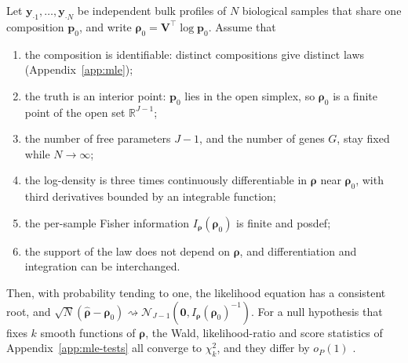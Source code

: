 \begin{proposition}
  \label{pr:mle-regularity}
  Let \(\boldsymbol{y}_{\cdot1},\ldots,\boldsymbol{y}_{\cdot N}\) be independent bulk profiles of \(N\) biological samples that share
  one composition \(\boldsymbol{p}_{0}\), and write \(\boldsymbol{\rho}_{0}=\mathbf{V}^{\top}\log\boldsymbol{p}_{0}\).
  Assume that
  \begin{enumerate}
    \item[(R1)] the composition is identifiable: distinct compositions give distinct laws (Appendix~\ref{app:mle});
    \item[(R2)] the truth is an interior point: \(\boldsymbol{p}_{0}\) lies in the open simplex, so \(\boldsymbol{\rho}_{0}\) is a finite
          point of the open set \(\mathbb{R}^{J-1}\);
    \item[(R3)] the number of free parameters \(J-1\), and the number of genes \(G\), stay fixed while
          \(N\to\infty\);
    \item[(R4)] the log-density is three times continuously differentiable in \(\boldsymbol{\rho}\) near \(\boldsymbol{\rho}_{0}\), with third
          derivatives bounded by an integrable function;
    \item[(R5)] the per-sample Fisher information \(I_{\boldsymbol{\rho}}(\boldsymbol{\rho}_{0})\) is finite and \gls{posdef};
    \item[(R6)] the support of the law does not depend on \(\boldsymbol{\rho}\), and differentiation and integration
          can be interchanged.
  \end{enumerate}
  Then, with probability tending to one, the likelihood equation has a consistent root, and
  \(\sqrt{N}(\hat{\boldsymbol{\rho}}-\boldsymbol{\rho}_{0})\rightsquigarrow\mathcal{N}_{J-1}(\boldsymbol{0},I_{\boldsymbol{\rho}}(\boldsymbol{\rho}_{0})^{-1})\).
  For a null hypothesis that fixes \(k\) smooth functions of \(\boldsymbol{\rho}\), the Wald, likelihood-ratio and
  score statistics of Appendix~\ref{app:mle-tests} all converge to \(\chi^{2}_{k}\), and they differ by
  \(o_{P}(1)\) \cite[Sects.~9.2--9.3]{coxTheoreticalStatistics1979}.
\end{proposition}

